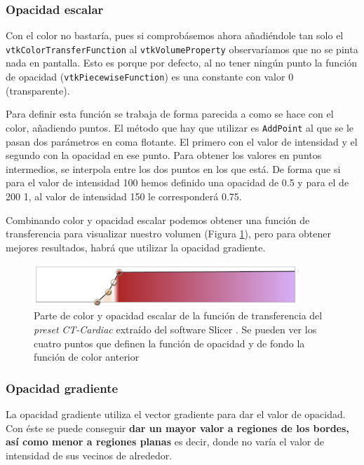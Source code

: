 \subsubsection{Opacidad escalar}

Con el color no bastaría, pues si comprobásemos ahora añadiéndole tan solo el \texttt{vtkColorTransferFunction} al \texttt{vtkVolumeProperty} observaríamos que no se pinta nada en pantalla. Esto es porque por defecto, al no tener ningún punto la función de opacidad (\texttt{vtkPiecewiseFunction}) es una constante con valor 0 (transparente). 

Para definir esta función se trabaja de forma parecida a como se hace con el color, añadiendo puntos. El método que hay que utilizar es \texttt{AddPoint} al que se le pasan dos parámetros en coma flotante. El primero con el valor de intensidad y el segundo con la opacidad en ese punto. Para obtener los valores en puntos intermedios, se interpola entre los dos puntos en los que está. De forma que si para el valor de intensidad 100 hemos definido una opacidad de 0.5 y para el de 200 1, al valor de intensidad 150 le corresponderá 0.75.

Combinando color y opacidad escalar podemos obtener una función de transferencia para visualizar nuestro volumen (Figura \ref{fig:opacity_tf}), pero para obtener mejores resultados, habrá que utilizar la opacidad gradiente. 

\begin{figure}[H]
	\centering
	\includegraphics[width=10cm]{imagenes/opacity_tf}
	\caption{Parte de color y opacidad escalar de la función de transferencia del \textit{preset} \textit{CT-Cardiac} extraído del software Slicer \cite{slicer}. Se pueden ver los cuatro puntos que definen la función de opacidad y de fondo la función de color anterior}
	\label{fig:opacity_tf}
\end{figure}

\subsubsection{Opacidad gradiente}

La opacidad gradiente utiliza el vector gradiente para dar el valor de opacidad. Con éste se puede conseguir \textbf{dar un mayor valor a regiones de los bordes, así como menor a regiones planas} es decir, donde no varía el valor de intensidad de sus vecinos de alrededor.

